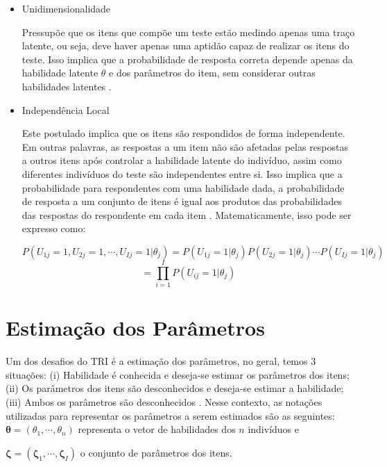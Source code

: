 \begin{itemize}
	
\item  Unidimensionalidade

Pressupõe que os itens que compõe um teste estão medindo apenas uma traço latente, ou seja, deve haver apenas uma aptidão capaz de realizar os itens do teste. Isso implica que a probabilidade de resposta correta depende apenas da habilidade latente $\theta$ e dos parâmetros do item, sem considerar outras habilidades latentes \cite{pasquali1996}.

\item  Independência Local

Este postulado implica que os itens são respondidos de forma independente. Em outras palavras, as respostas a um item não são afetadas pelas respostas a outros itens após controlar a habilidade latente do indivíduo, assim como diferentes indivíduos do teste são independentes entre si. Isso implica que a probabilidade para respondentes com uma habilidade dada, a probabilidade de resposta a um conjunto de itens é igual aos produtos das probabilidades das respostas do respondente em cada item \cite{pasquali1996}. Matematicamente, isso pode ser expresso como:


\[
 P(U_{1j} = 1, U_{2j} = 1, \cdots, U_{Ij} = 1 |\theta_j) = 
 P(U_{1j} = 1|\theta_j)  P(U_{2j} = 1|\theta_j) \cdots P(U_{Ij} = 1|\theta_j) 
\] 
\[
 = \prod_{i=1}^{I}P(U_{ij} = 1|\theta_j) 
\]

\end{itemize}
\section{Estimação dos Parâmetros}


Um dos desafios do TRI é a estimação dos parâmetros, no geral, temos 3 situações:  (i) Habilidade é conhecida e deseja-se estimar os parâmetros dos itens; (ii) Os parâmetros dos itens são desconhecidos e deseja-se estimar a habilidade; (iii) Ambos os parâmetros são desconhecidos \cite{de2000teoria}.  Nesse contexto, as notações utilizadas para representar os parâmetros a serem estimados são as seguintes:\\


\noindent $ \boldsymbol{\theta} = (\theta_1, \cdots, \theta_n) $  representa o vetor de habilidades dos $n$ indivíduos e

\noindent $ \boldsymbol{\zeta} = (\boldsymbol{\zeta}_1, \cdots, \boldsymbol{\zeta}_I) $ o conjunto de parâmetros dos itens.

